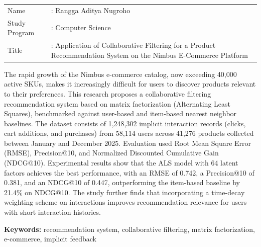 \documentclass[12pt,a4paper]{report}
\begin{document}
\begin{singlespace}
\noindent
\begin{tabularx}{\textwidth}{@{}p{2.6cm}X@{}}
Name & : Rangga Aditya Nugroho \\
Study Program & : Computer Science \\
Title & : Application of Collaborative Filtering for a Product
  Recommendation System on the Nimbus E-Commerce Platform \\
\end{tabularx}

\vspace{0.5cm}
\noindent
The rapid growth of the Nimbus e-commerce catalog, now exceeding 40,000
active SKUs, makes it increasingly difficult for users to discover products
relevant to their preferences. This research proposes a collaborative
filtering recommendation system based on matrix factorization (Alternating
Least Squares), benchmarked against user-based and item-based nearest
neighbor baselines. The dataset consists of 1,248,302 implicit interaction
records (clicks, cart additions, and purchases) from 58,114 users across
41,276 products collected between January and December 2025. Evaluation
used Root Mean Square Error (RMSE), Precision@10, and Normalized Discounted
Cumulative Gain (NDCG@10). Experimental results show that the ALS model with
64 latent factors achieves the best performance, with an RMSE of 0.742, a
Precision@10 of 0.381, and an NDCG@10 of 0.447, outperforming the
item-based baseline by 21.4\% on NDCG@10. The study further finds that
incorporating a time-decay weighting scheme on interactions improves
recommendation relevance for users with short interaction histories.

\vspace{0.4cm}
\noindent
\textbf{Keywords:} recommendation system, collaborative filtering, matrix
factorization, e-commerce, implicit feedback
\end{singlespace}

\newpage
\tableofcontents

\newpage
\listoffigures

\newpage
\listoftables
\end{document}
